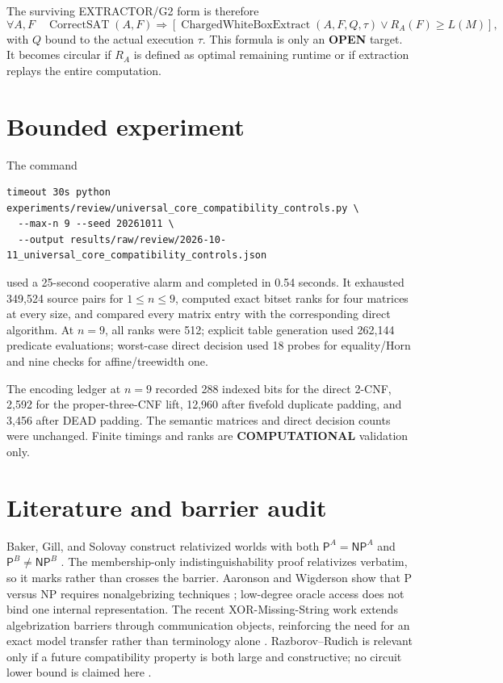 \documentclass[11pt]{article}
\newcommand{\Pclass}{\mathsf P}
\newcommand{\NPclass}{\mathsf{NP}}
\begin{document}
The surviving EXTRACTOR/G2 form is therefore
\[
 \forall A,F\quad \operatorname{CorrectSAT}(A,F)
 \Longrightarrow
 \left[
  \operatorname{ChargedWhiteBoxExtract}(A,F,Q,\tau)
  \lor R_A(F)\ge L(M)
 \right],
\]
with $Q$ bound to the actual execution $\tau$.  This formula is only an
\textbf{OPEN} target.  It becomes circular if $R_A$ is defined as optimal
remaining runtime or if extraction replays the entire computation.

\section{Bounded experiment}
The command
\begin{verbatim}
timeout 30s python experiments/review/universal_core_compatibility_controls.py \
  --max-n 9 --seed 20261011 \
  --output results/raw/review/2026-10-11_universal_core_compatibility_controls.json
\end{verbatim}
used a 25-second cooperative alarm and completed in 0.54 seconds.  It
exhausted 349,524 source pairs for $1\le n\le9$, computed exact bitset ranks
for four matrices at every size, and compared every matrix entry with the
corresponding direct algorithm.  At $n=9$, all ranks were 512; explicit table
generation used 262,144 predicate evaluations; worst-case direct decision
used 18 probes for equality/Horn and nine checks for affine/treewidth one.

The encoding ledger at $n=9$ recorded 288 indexed bits for the direct 2-CNF,
2,592 for the proper-three-CNF lift, 12,960 after fivefold duplicate padding,
and 3,456 after DEAD padding.  The semantic matrices and direct decision
counts were unchanged.  Finite timings and ranks are \textbf{COMPUTATIONAL}
validation only.

\section{Literature and barrier audit}
Baker, Gill, and Solovay construct relativized worlds with both
$\Pclass^A=\NPclass^A$ and $\Pclass^B\ne\NPclass^B$ \cite{bgs}.  The
membership-only indistinguishability proof relativizes verbatim, so it marks
rather than crosses the barrier.  Aaronson and Wigderson show that P versus NP
requires nonalgebrizing techniques \cite{aw}; low-degree oracle access does
not bind one internal representation.  The recent XOR-Missing-String work
extends algebrization barriers through communication objects, reinforcing the
need for an exact model transfer rather than terminology alone \cite{chr}.
Razborov--Rudich is relevant only if a future compatibility property is both
large and constructive; no circuit lower bound is claimed here \cite{rr}.
\end{document}
